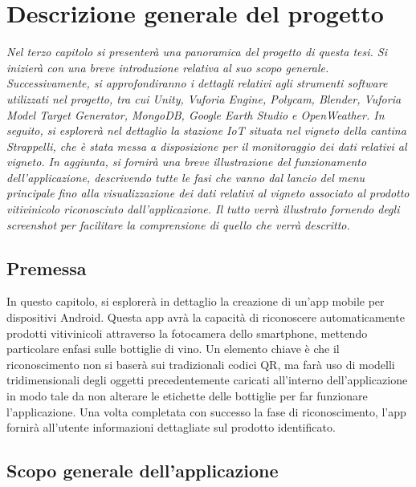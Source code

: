 \chapter{Descrizione generale del progetto}

\begin{preamble}
{\em 
Nel terzo capitolo si presenterà una panoramica del progetto di questa tesi. Si inizierà con una breve introduzione relativa al suo scopo generale. Successivamente, si approfondiranno i dettagli relativi agli strumenti software utilizzati nel progetto, tra cui Unity, Vuforia Engine, Polycam, Blender, Vuforia Model Target Generator, MongoDB, Google Earth Studio e OpenWeather. \newline \indent In seguito, si esplorerà nel dettaglio la stazione IoT situata nel vigneto della cantina Strappelli, che è stata messa a disposizione per il monitoraggio dei dati relativi al vigneto. In aggiunta, si fornirà una breve illustrazione del funzionamento dell'applicazione, descrivendo tutte le fasi che vanno dal lancio del menu principale fino alla visualizzazione dei dati relativi al vigneto associato al prodotto vitivinicolo riconosciuto dall'applicazione. Il tutto verrà illustrato fornendo degli screenshot per facilitare la comprensione di quello che verrà descritto.
}
\end{preamble}

\section{Premessa}

In questo capitolo, si esplorerà in dettaglio la creazione di un'app mobile per dispositivi Android. Questa app avrà la capacità di riconoscere automaticamente prodotti vitivinicoli attraverso la fotocamera dello smartphone, mettendo particolare enfasi sulle bottiglie di vino. Un elemento chiave è che il riconoscimento non si baserà sui tradizionali codici QR, ma farà uso di modelli tridimensionali degli oggetti precedentemente caricati all'interno dell'applicazione in modo tale da non alterare le etichette delle bottiglie per far funzionare l'applicazione. Una volta completata con successo la fase di riconoscimento, l'app fornirà all'utente informazioni dettagliate sul prodotto identificato.

\section{Scopo generale dell'applicazione}

